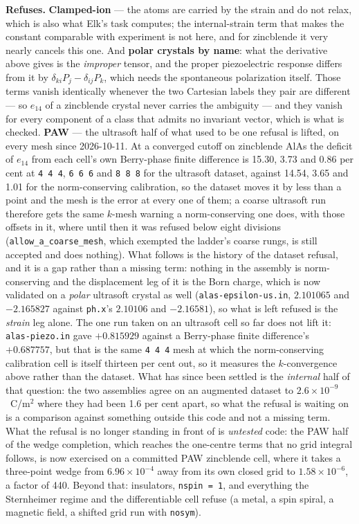 \documentclass[11pt,a4paper]{article}
\newcommand{\code}[1]{\texttt{\small #1}}
\begin{document}
\begin{refuses}
\textbf{Refuses.} \textbf{Clamped-ion} --- the atoms are carried by the strain
and do not relax, which is also what Elk's task computes; the internal-strain
term that makes the constant comparable with experiment is not here, and for
zincblende it very nearly cancels this one. And \textbf{polar crystals by
name}: what the derivative above gives is the \emph{improper} tensor, and the
proper piezoelectric response differs from it by
$\delta_{ki}P_j - \delta_{ij}P_k$, which needs the spontaneous polarization
itself. Those terms vanish identically whenever the two Cartesian labels they
pair are different --- so $e_{14}$ of a zincblende crystal never carries the
ambiguity --- and they vanish for every component of a class that admits no
invariant vector, which is what is checked. \textbf{PAW} --- the ultrasoft
half of what used to be one refusal is lifted, on every mesh since 2026-10-11.
At a converged cutoff on zincblende AlAs the deficit of $e_{14}$ from each
cell's own Berry-phase finite difference is 15.30, 3.73 and 0.86 per cent at
\code{4 4 4}, \code{6 6 6} and \code{8 8 8} for the ultrasoft dataset, against
14.54, 3.65 and 1.01 for the norm-conserving calibration, so the dataset moves
it by less than a point and the mesh is the error at every one of them; a coarse
ultrasoft run therefore gets the same $k$-mesh warning a norm-conserving one
does, with those offsets in it, where until then it was refused below eight
divisions (\code{allow\_a\_coarse\_mesh}, which exempted the ladder's coarse
rungs, is still accepted and does nothing). What follows is the history of the
dataset refusal, and it is a gap rather
than a missing term: nothing in the assembly is norm-conserving and the
displacement leg of it is the Born charge, which is now validated on a
\emph{polar} ultrasoft crystal as well (\code{alas-epsilon-us.in}, $2.101065$
and $-2.165827$ against \code{ph.x}'s $2.10106$ and $-2.16581$), so what is
left refused is the \emph{strain} leg alone. The one run taken on an ultrasoft
cell so far does not lift it: \code{alas-piezo.in} gave $+0.815929$ against a
Berry-phase finite difference's $+0.687757$, but that is the same \code{4 4 4}
mesh at which the norm-conserving calibration cell is itself thirteen per cent
out, so it measures the $k$-convergence above rather than the dataset. What has
since been settled is the \emph{internal} half of that question: the two
assemblies agree on an augmented dataset to $2.6\times10^{-9}$~C/m$^2$ where
they had been 1.6 per cent apart, so what the refusal is waiting on is a
comparison against something outside this code and not a missing term. What the
refusal is no longer standing in front of is \emph{untested} code: the PAW half
of the wedge completion, which reaches the one-centre terms that no grid
integral follows, is now exercised on a committed PAW zincblende cell, where it
takes a three-point wedge from $6.96\times10^{-4}$ away from its own closed grid
to $1.58\times10^{-6}$, a factor of 440. Beyond that: insulators, \code{nspin = 1}, and
everything the Sternheimer regime and the differentiable cell refuse (a metal, a
spin spiral, a magnetic field, a shifted grid run with \code{nosym}).
\end{refuses}
\end{document}
